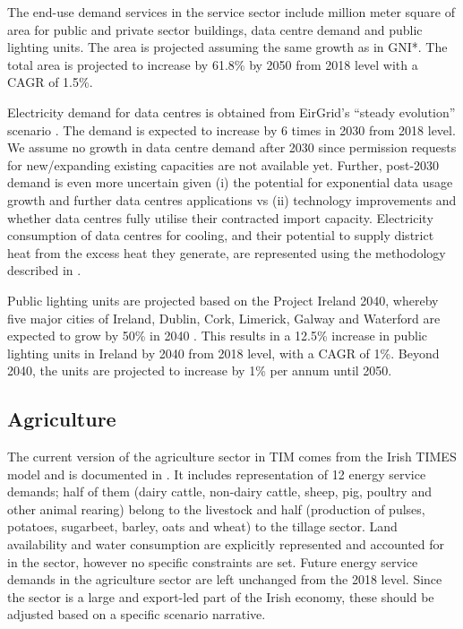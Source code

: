 \documentclass[gmd,manuscript]{copernicus}
\begin{document}
The end-use demand services in the service sector include million meter square of area for public and private sector buildings, data centre demand and public lighting units. The area is projected assuming the same growth as in GNI*. The total area is projected to increase by 61.8\% by 2050 from 2018 level with a CAGR of 1.5\%. 

Electricity demand for data centres is obtained from EirGrid's ``steady evolution'' scenario \citep{EirGridT57:online}. The demand is expected to increase by 6 times in 2030 from 2018 level. We assume no growth in data centre demand after 2030 since permission requests for new/expanding existing capacities are not available yet. Further, post-2030 demand is even more uncertain given (i) the potential for exponential data usage growth and further data centres applications vs (ii) technology improvements and whether data centres fully utilise their contracted import capacity. Electricity consumption of data centres for cooling, and their potential to supply district heat from the excess heat they generate, are represented using the methodology described in \citet{Petrovic2020}. 

Public lighting units are projected based on the Project Ireland 2040, whereby five major cities of Ireland, Dublin, Cork, Limerick, Galway and Waterford are expected to grow by 50\% in 2040 \citep{GovernmentofIreland2018}. This results in a 12.5\% increase in public lighting units in Ireland by 2040 from 2018 level, with a CAGR of 1\%. Beyond 2040, the units are projected to increase by 1\% per annum until 2050.

\subsection{Agriculture}
\label{ss:agriculture}
The current version of the agriculture sector in TIM comes from the Irish TIMES model and is documented in \citet{Chiodi2016}. It includes representation of 12 energy service demands; half of them (dairy cattle, non-dairy cattle, sheep, pig, poultry and other animal rearing) belong to the livestock and half (production of pulses, potatoes, sugarbeet, barley, oats and wheat) to the tillage sector. Land availability and water consumption are explicitly represented and accounted for in the sector, however no specific constraints are set. Future energy service demands in the agriculture sector are left unchanged from the 2018 level. Since the sector is a large and export-led part of the Irish economy, these should be adjusted based on a specific scenario narrative. 
\end{document}
